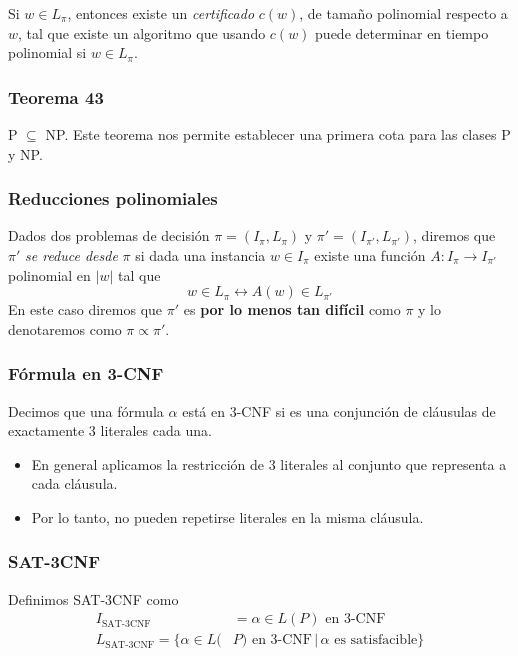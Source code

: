 \begin{multicols}{2}
    Si $w \in L_\pi$, entonces existe un \textit{certificado} $c(w)$, de tamaño polinomial respecto a $w$, tal que existe un algoritmo que usando $c(w)$ puede determinar en tiempo polinomial si $w \in L_\pi$.
    
    \subsubsection*{Teorema 43}
    P $\subseteq$ NP. Este teorema nos permite establecer una primera cota para las clases P y NP.
    
    \subsubsection*{Reducciones polinomiales}
    Dados dos problemas de decisión $\pi = (I_\pi, L_\pi)$ y $\pi' = (I_{\pi'}, L_{\pi'})$, diremos que $\pi'$ \textit{se reduce desde} $\pi$ si dada una instancia $w \in I_\pi$ existe una función $A: I_\pi \rightarrow I_{\pi'}$ polinomial en $|w|$ tal que
    $$
    w \in L_\pi \leftrightarrow A(w) \in L_{\pi'}
    $$
    En este caso diremos que $\pi'$ es \textbf{por lo menos tan difícil} como $\pi$ y lo denotaremos como $\pi \propto \pi'$.
    
    \subsubsection*{Fórmula en 3-CNF}
    Decimos que una fórmula $\alpha$ está en 3-CNF si es una conjunción de cláusulas de exactamente 3 literales cada una.
    \begin{itemize}
        \item En general aplicamos la restricción de 3 literales al conjunto que representa a cada cláusula.
        \item Por lo tanto, no pueden repetirse literales en la misma cláusula.
    \end{itemize}
    
    \subsubsection*{SAT-3CNF}
    Definimos SAT-3CNF como
    \begin{align*}
        I_{\text{SAT-3CNF}} &= \alpha \in L(P) \text{ en 3-CNF} \\
        L_{\text{SAT-3CNF}} = \{ \alpha \in L(&P) \text{ en 3-CNF} \,|\, \alpha \text{ es satisfacible} \}
    \end{align*}
    

\end{multicols}
